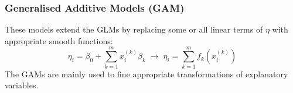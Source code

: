 \subsubsection{Generalised Additive Models (GAM)}
These models extend the GLMs by replacing some or all linear terms of $\eta$ with appropriate smooth functions:
\begin{equation*}
\eta_i = \beta_0+\sum_{k=1}^{m}x_i^{(k)}\beta_k \; \rightarrow \; \eta_i = \sum_{k=1}^{m}f_k\left(x_i^{(k)}\right)
\end{equation*}
The GAMs are mainly used to fine appropriate transformations of explanatory variables.
